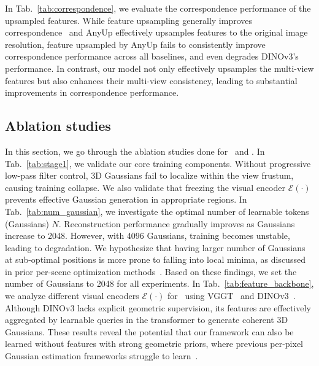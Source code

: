 In Tab.~\ref{tab:correspondence}, we evaluate the correspondence performance of the upsampled features. While feature upsampling generally improves correspondence~\cite{leroy2024grounding, edstedt2024roma} and AnyUp effectively upsamples features to the original image resolution, feature upsampled by AnyUp fails to consistently improve correspondence performance across all baselines, and even degrades DINOv3's performance. In contrast, our model not only effectively upsamples the multi-view features but also enhances their multi-view consistency, leading to substantial improvements in correspondence performance. 


\subsection{Ablation studies}
\label{subsec:ablation}
In this section, we go through the ablation studies done for \ours\ and \oursF. In Tab.~\ref{tab:stage1}, we validate our core training components. Without progressive low-pass filter control, 3D Gaussians fail to localize within the view frustum, causing training collapse. We also validate that freezing the visual encoder $\mathcal{E}(\cdot)$ prevents effective Gaussian generation in appropriate regions. In Tab.~\ref{tab:num_gaussian}, we investigate the optimal number of learnable tokens (Gaussians) $N$. Reconstruction performance gradually improves as Gaussians increase to 2048. However, with 4096 Gaussians, training becomes unstable, leading to degradation. We hypothesize that having larger number of Gaussians at sub-optimal positions is more prone to falling into local minima, as discussed in prior per-scene optimization methods~\cite{jung2024relaxing}. Based on these findings, we set the number of Gaussians to 2048 for all experiments. In Tab.~\ref{tab:feature_backbone}, we analyze different visual encoders $\mathcal{E}(\cdot)$ for \ours\, using VGGT~\cite{wang2025vggt} and DINOv3~\cite{simeoni2025dinov3}. Although DINOv3 lacks explicit geometric supervision, its features are effectively aggregated by learnable queries in the transformer to generate coherent 3D Gaussians. These results reveal the potential that our framework can also be learned without features with strong geometric priors, where previous per-pixel Gaussian estimation frameworks struggle to learn~\cite{ye2024no}.




